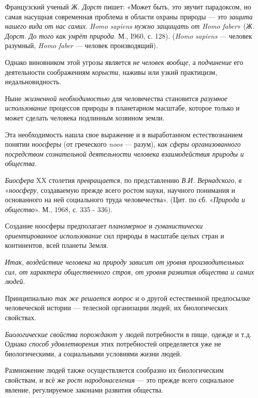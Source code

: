 \documentclass[a4paper,14pt,russian]{extreport}
\begin{document}
Французский ученый \emph{Ж. Дорст} пишет: «Может быть, это звучит парадоксом, но самая насущная современная проблема в области охраны природы --- это \emph{защита нашего вида от нас самих}. \emph{Homo sapiens нужно защищать от Homo faber}» (\emph{Ж. Дорст}. \emph{До того как умрёт природа}. М., I960, с. 128). (\emph{Homo sapiens} --- человек разумный, \emph{Homo faber} --- человек производящий).

Однако виновником этой угрозы является \emph{не человек вообще}, а \emph{подчинение} его деятельности соображениям \emph{корысти}, наживы или узкий практицизм, недальновидность.

Ныне \emph{жизненной необходимостью} для человечества становится \emph{разумное использование} процессов природы в планетарном масштабе, которое только и может сделать человека подлинным хозяином земли.

Эта необходимость нашла свое выражение и в выработанном естествознанием понятии \emph{ноосферы} (от греческого \emph{noos} --- разум), \emph{как сферы организованного посредством сознательной деятельности человека взаимодействия природы и общества.}

\emph{Биосфера} XX столетия \emph{превращается}, по представлению \emph{В.И. Вернадского}, \emph{в} «\emph{ноосферу}, создаваемую прежде всего ростом науки, научного понимания и основанного на ней социального труда человечества». (Цит. по сб. «\emph{Природа и общество}». М., 1968, с. 335 - 336).

Создание ноосферы предполагает \emph{планомерное} и \emph{гуманистически ориентированное использование} сил природы в масштабе целых стран и континентов, всей планеты Земля.

\emph{Итак, воздействие человека на природу зависит от уровня производительных сил, от характера общественного строя, от уровня} \emph{развития общества и самих людей}.

Принципиально \emph{так же решается вопрос} и о другой естественной предпосылке человеческой истории --- телесной организации людей, их биологических свойствах.

\emph{Биологические свойства порождают} у людей потребности в пище, одежде и т.д. Однако \emph{способ удовлетворения} этих потребностей определяется уже не биологическими, а социальными условиями жизни людей.

Размножение людей также осуществляется сообразно их биологическим свойствам, и всё же \emph{рост народонаселения} --- это прежде всего социальное явление, регулируемое законами развития общества.
\end{document}
